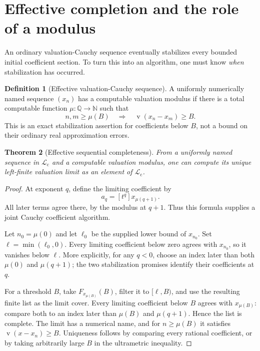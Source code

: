 \documentclass[11pt,letterpaper]{article}
\numberwithin{equation}{section}
\newtheorem{theorem}{Theorem}[section]
\theoremstyle{definition}
\newtheorem{definition}[theorem]{Definition}
\theoremstyle{remark}
\newcommand{\Lc}{\mathcal L_{\mathrm c}}
\newcommand{\Q}{\mathbb Q}
\newcommand{\N}{\mathbb N}
\newcommand{\val}{\operatorname{v}}
\newcommand{\coef}[2]{[t^{#1}]#2}
\begin{document}
\section{Effective completion and the role of a modulus}
\label{sec:completion}

An ordinary valuation-Cauchy sequence eventually stabilizes every bounded
initial coefficient section. To turn this into an algorithm, one must know
\emph{when} stabilization has occurred.

\begin{definition}[Effective valuation-Cauchy sequence]
A uniformly numerically named sequence $(x_n)$ has a computable valuation
modulus if there is a total computable function $\mu:\Q\to\N$ such that
\begin{equation}\label{eq:modulus}
 n,m\ge\mu(B)\quad\Longrightarrow\quad
 \val(x_n-x_m)\ge B.
\end{equation}
This is an exact stabilization assertion for coefficients below $B$, not
a bound on their ordinary real approximation errors.
\end{definition}

\begin{theorem}[Effective sequential completeness]
\label{thm:completion}
From a uniformly named sequence in $\Lc$ and a computable valuation
modulus, one can compute its unique left-finite valuation limit as an
element of $\Lc$.
\end{theorem}
\begin{proof}
At exponent $q$, define the limiting coefficient by
\begin{equation}\label{eq:limcoef}
 a_q=\coef q{x_{\mu(q+1)}}.
\end{equation}
All later terms agree there, by the modulus at $q+1$. Thus this formula
supplies a joint Cauchy coefficient algorithm.

Let $n_0=\mu(0)$ and let $\ell_0$ be the supplied lower bound of $x_{n_0}$.
Set $\ell=\min(\ell_0,0)$. Every limiting coefficient below zero agrees
with $x_{n_0}$, so it vanishes below $\ell$. More explicitly, for any
$q<0$, choose an index later than both $\mu(0)$ and $\mu(q+1)$; the two
stabilization promises identify their coefficients at $q$.

For a threshold $B$, take $F_{x_{\mu(B)}}(B)$, filter it to $[\ell,B)$,
and use the resulting finite list as the limit cover. Every limiting
coefficient below $B$ agrees with $x_{\mu(B)}$: compare both to an index
later than $\mu(B)$ and $\mu(q+1)$. Hence the list is complete. The limit
has a numerical name, and for $n\ge\mu(B)$ it satisfies
$\val(x-x_n)\ge B$. Uniqueness follows by comparing every rational
coefficient, or by taking arbitrarily large $B$ in the ultrametric
inequality.
\end{proof}
\end{document}
